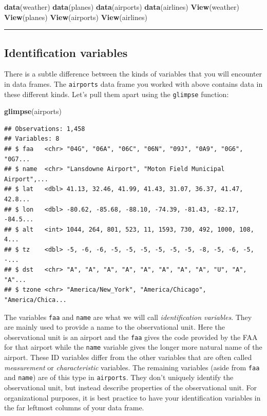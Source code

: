 \documentclass[]{tufte-book}
\newenvironment{Shaded}{\begin{snugshade}}{\end{snugshade}}
\newcommand{\KeywordTok}[1]{\textcolor[rgb]{0.13,0.29,0.53}{\textbf{{#1}}}}
\newcommand{\NormalTok}[1]{{#1}}
\let\oldrule=\rule
\renewcommand{\rule}[1]{\oldrule{\linewidth}}
\theoremstyle{definition}
\theoremstyle{definition}
\theoremstyle{remark}
\begin{document}
\begin{Shaded}
\begin{Highlighting}[]
\KeywordTok{data}\NormalTok{(weather)}
\KeywordTok{data}\NormalTok{(planes)}
\KeywordTok{data}\NormalTok{(airports)}
\KeywordTok{data}\NormalTok{(airlines)}
\KeywordTok{View}\NormalTok{(weather)}
\KeywordTok{View}\NormalTok{(planes)}
\KeywordTok{View}\NormalTok{(airports)}
\KeywordTok{View}\NormalTok{(airlines)}
\end{Highlighting}
\end{Shaded}

\begin{center}\rule{0.5\linewidth}{\linethickness}\end{center}

\subsection{Identification variables}\label{identification-variables}

There is a subtle difference between the kinds of variables that you
will encounter in data frames. The \texttt{airports} data frame you
worked with above contains data in these different kinds. Let's pull
them apart using the \texttt{glimpse} function:

\begin{Shaded}
\begin{Highlighting}[]
\KeywordTok{glimpse}\NormalTok{(airports)}
\end{Highlighting}
\end{Shaded}

\begin{verbatim}
## Observations: 1,458
## Variables: 8
## $ faa   <chr> "04G", "06A", "06C", "06N", "09J", "0A9", "0G6", "0G7...
## $ name  <chr> "Lansdowne Airport", "Moton Field Municipal Airport",...
## $ lat   <dbl> 41.13, 32.46, 41.99, 41.43, 31.07, 36.37, 41.47, 42.8...
## $ lon   <dbl> -80.62, -85.68, -88.10, -74.39, -81.43, -82.17, -84.5...
## $ alt   <int> 1044, 264, 801, 523, 11, 1593, 730, 492, 1000, 108, 4...
## $ tz    <dbl> -5, -6, -6, -5, -5, -5, -5, -5, -5, -8, -5, -6, -5, -...
## $ dst   <chr> "A", "A", "A", "A", "A", "A", "A", "A", "U", "A", "A"...
## $ tzone <chr> "America/New_York", "America/Chicago", "America/Chica...
\end{verbatim}

The variables \texttt{faa} and \texttt{name} are what we will call
\emph{identification variables}. They are mainly used to provide a name
to the observational unit. Here the observational unit is an airport and
the \texttt{faa} gives the code provided by the FAA for that airport
while the \texttt{name} variable gives the longer more natural name of
the airport. These ID variables differ from the other variables that are
often called \emph{measurement} or \emph{characteristic} variables. The
remaining variables (aside from \texttt{faa} and \texttt{name}) are of
this type in \texttt{airports}. They don't uniquely identify the
observational unit, but instead describe properties of the observational
unit. For organizational purposes, it is best practice to have your
identification variables in the far leftmost columns of your data frame.
\end{document}
